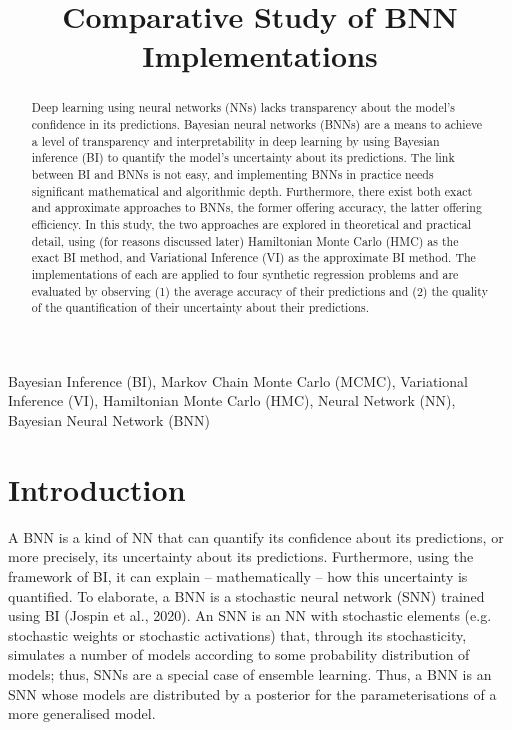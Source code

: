 \documentclass[conference]{IEEEtran}
\begin{document}


\title{Comparative Study of BNN Implementations\\}

\author{}

\maketitle

\begin{abstract}
Deep learning using neural networks (NNs) lacks transparency about the model's confidence in its predictions. Bayesian neural networks (BNNs) are a means to achieve a level of transparency and interpretability in deep learning by using Bayesian inference (BI) to quantify the model's uncertainty about its predictions. The link between BI and BNNs is not easy, and implementing BNNs in practice needs significant mathematical and algorithmic depth. Furthermore, there exist both exact and approximate approaches to BNNs, the former offering accuracy, the latter offering efficiency. In this study, the two approaches are explored in theoretical and practical detail, using (for reasons discussed later) Hamiltonian Monte Carlo (HMC) as the exact BI method, and Variational Inference (VI) as the approximate BI method. The implementations of each are applied to four synthetic regression problems and are evaluated by observing (1) the average accuracy of their predictions and (2) the quality of the quantification of their uncertainty about their predictions.
\end{abstract}

\begin{IEEEkeywords}
Bayesian Inference (BI), Markov Chain Monte Carlo (MCMC), Variational Inference (VI), Hamiltonian Monte Carlo (HMC), Neural Network (NN), Bayesian Neural Network (BNN)
\end{IEEEkeywords}

\section{Introduction}
A BNN is a kind of NN that can quantify its confidence about its predictions, or more precisely, its uncertainty about its predictions. Furthermore, using the framework of BI, it can explain – mathematically – how this uncertainty is quantified. To elaborate, a BNN is a stochastic neural network (SNN) trained using BI (Jospin et al., 2020). An SNN is an NN with stochastic elements (e.g. stochastic weights or stochastic activations) that, through its stochasticity, simulates a number of models according to some probability distribution of models; thus, SNNs are a special case of ensemble learning. Thus, a BNN is an SNN whose models are distributed by a posterior for the parameterisations of a more generalised model.\\
\end{document}
